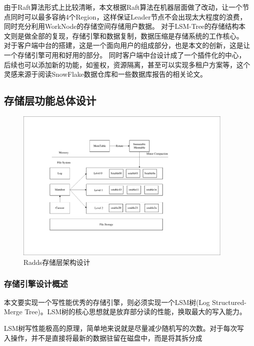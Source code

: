 \begin{enumerate}[fullwidth,itemindent=2em,listparindent=2em]
			由于Raft算法形式上比较清晰，本文根据Raft算法在机器层面做了改动，让一个节点同时可以最多容纳4个Region，这样保证Leader节点不会出现太大程度的浪费，
			同时充分利用WorkNode的存储空间存储用户数据。
			对于LSM-Tree的存储结构本文则是做全部的复现，存储引擎和数据复制，数据压缩是存储系统的工作核心。
			对于客户端中台的搭建，这是一个面向用户的组成部分，也是本文的创新，这是让一个存储引擎可用和好用的部分。
			同时客户端中台设计成了一个插件化的中心，后续也可以添加新的功能，如鉴权，资源隔离，甚至可以实现多租户方案等，这个灵感来源于阅读SnowFlake数据仓库和一些数据库报告的相关论文。
	
		\end{enumerate}
		

		  
	\subsection{存储层功能总体设计}
			
	\begin{figure}[H]
		\centering
		\includegraphics[width=0.95\textwidth]{pdf/leveldb_arch.pdf}
		\caption{Radds存储层架构设计}
		\label{mobile_overall_design}
	\end{figure}


		\subsubsection{存储引擎设计概述}
		
		本文要实现一个写性能优秀的存储引擎，则必须实现一个LSM树(Log Structured-Merge Tree)。LSM树的核心思想就是放弃部分读的性能，换取最大的写入能力。

		LSM树写性能极高的原理，简单地来说就是尽量减少随机写的次数。对于每次写入操作，并不是直接将最新的数据驻留在磁盘中，而是将其拆分成
		

